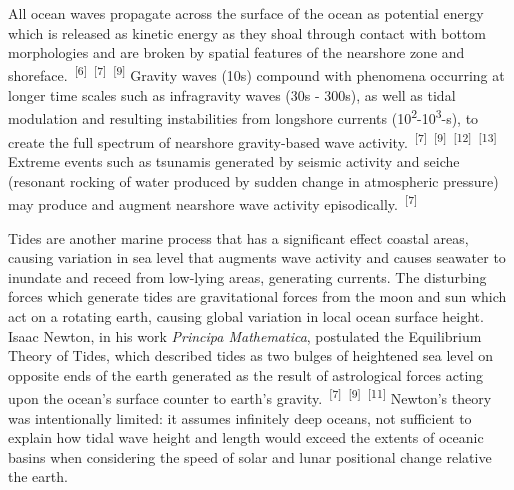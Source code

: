 \documentclass{article}
\begin{document}

\par{All ocean waves propagate across the surface of the ocean as potential energy which is released as kinetic energy as they shoal through contact with bottom morphologies and are broken by spatial features of the nearshore zone and shoreface.~\textsuperscript{[6]}~\textsuperscript{[7]}~\textsuperscript{[9]} Gravity waves (10s) compound with phenomena occurring at longer time scales such as infragravity waves (30s - 300s), as well as tidal modulation and resulting instabilities from longshore currents (10\textsuperscript{2}-10\textsuperscript{3}-s), to create the full spectrum of nearshore gravity-based wave activity.~\textsuperscript{[7]}~\textsuperscript{[9]}~\textsuperscript{[12]}~\textsuperscript{[13]} Extreme events such as tsunamis generated by seismic activity and seiche (resonant rocking of water produced by sudden change in atmospheric pressure) may produce and augment nearshore wave activity episodically.~\textsuperscript{[7]}}


\par{Tides are another marine process that has a significant effect coastal areas, causing variation in sea level that augments wave activity and causes seawater to inundate and receed from low-lying areas, generating currents. The disturbing forces which generate tides are gravitational forces from the moon and sun which act on a rotating earth, causing global variation in local ocean surface height. Isaac Newton, in his work \textit{Principa Mathematica}, postulated the Equilibrium Theory of Tides, which described tides as two bulges of heightened sea level on opposite ends of the earth generated as the result of astrological forces acting upon the ocean's surface counter to earth's gravity.~\textsuperscript{[7]}~\textsuperscript{[9]}~\textsuperscript{[11]} Newton's theory was intentionally limited: it assumes infinitely deep oceans, not sufficient to explain how tidal wave height and length would exceed the extents of oceanic basins when considering the speed of solar and lunar positional change relative the earth.}

\end{document}
